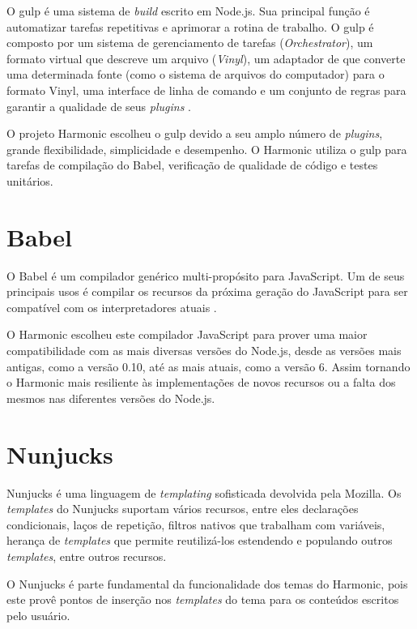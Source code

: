 \documentclass[ppginf, pep]{esinucpel}
\begin{document}
O gulp é uma sistema de \textit{build} escrito em Node.js. Sua principal função é automatizar tarefas repetitivas e aprimorar a rotina de trabalho. O gulp é composto por um sistema de gerenciamento de tarefas (\textit{Orchestrator}), um formato virtual que descreve um arquivo (\textit{Vinyl}), um adaptador de que converte uma determinada fonte (como o sistema de arquivos do computador) para o formato Vinyl, uma interface de linha de comando e um conjunto de regras para garantir a qualidade de seus \textit{plugins} \cite{gulp}.

O projeto Harmonic escolheu o gulp devido a seu amplo número de \textit{plugins}, grande flexibilidade, simplicidade e desempenho. O Harmonic utiliza o gulp para tarefas de compilação do Babel, verificação de qualidade de código e testes unitários.

\section{Babel}

O Babel é um compilador genérico multi-propósito para JavaScript. Um de seus principais usos é compilar os recursos da próxima geração do JavaScript para ser compatível com os interpretadores atuais \cite{babel}.

O Harmonic escolheu este compilador JavaScript para prover uma maior compatibilidade com as mais diversas versões do Node.js, desde as versões mais antigas, como a versão 0.10, até as mais atuais, como a versão 6. Assim tornando o Harmonic mais resiliente às implementações de novos recursos ou a falta dos mesmos nas diferentes versões do Node.js.

\section{Nunjucks}

Nunjucks é uma linguagem de \textit{templating} sofisticada devolvida pela Mozilla. Os \textit{templates} do Nunjucks suportam vários recursos, entre eles declarações condicionais, laços de repetição, filtros nativos que trabalham com variáveis, herança de \textit{templates} que permite reutilizá-los estendendo e populando outros \textit{templates}, entre outros recursos.

O Nunjucks é parte fundamental da funcionalidade dos temas do Harmonic, pois este provê pontos de inserção nos \textit{templates} do tema para os conteúdos escritos pelo usuário.

\end{document}
